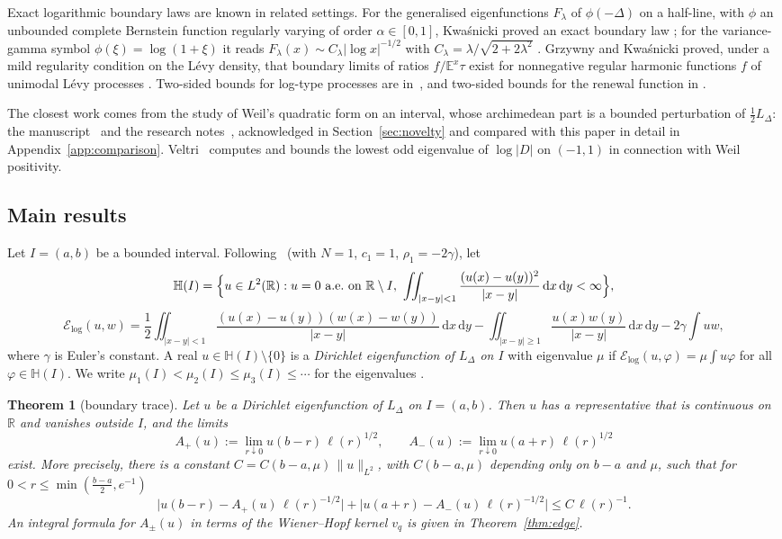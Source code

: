 \documentclass[11pt]{amsart}
\newcommand{\R}{\mathbb{R}}
\newcommand{\E}{\mathcal{E}}
\newcommand{\Hs}{\mathbb{H}}
\newcommand{\LD}{L_\Delta}
\newcommand{\dd}{\,\mathrm{d}}
\newtheorem{theorem}{Theorem}[section]
\theoremstyle{definition}
\theoremstyle{remark}
\numberwithin{equation}{section}
\begin{document}
Exact logarithmic boundary laws are known in related settings. For the generalised eigenfunctions $F_\lambda$ of $\phi(-\Delta)$ on a half-line, with $\phi$ an unbounded complete Bernstein function regularly varying of order $\alpha\in[0,1]$, Kwa\'snicki proved an exact boundary law \cite[Lemma~4.27]{Kw11}; for the variance-gamma symbol $\phi(\xi)=\log(1+\xi)$ it reads $F_\lambda(x)\sim C_\lambda|\log x|^{-1/2}$ with $C_\lambda=\lambda/\sqrt{2+2\lambda^2}$ \cite[Ex.~6.4]{Kw11}. Grzywny and Kwa\'snicki proved, under a mild regularity condition on the L\'evy density, that boundary limits of ratios $f/\mathbb E^x\tau$ exist for nonnegative regular harmonic functions $f$ of unimodal L\'evy processes \cite[Thm.~1.11]{GK18}. Two-sided bounds for log-type processes are in~\cite{GR12,KM14,BGR15}, and two-sided bounds for the renewal function in \cite[Thm.~4.4]{KMR13}.

The closest work comes from the study of Weil's quadratic form on an interval, whose archimedean part is a bounded perturbation of $\frac12\LD$: the manuscript~\cite{BT26} and the research notes~\cite{Mathia26}, acknowledged in Section~\ref{sec:novelty} and compared with this paper in detail in Appendix~\ref{app:comparison}. Veltri~\cite{Ve26} computes and bounds the lowest odd eigenvalue of $\log|D|$ on $(-1,1)$ in connection with Weil positivity.

\subsection{Main results}
Let $I=(a,b)$ be a bounded interval. Following~\cite{CW19} (with $N=1$, $c_1=1$, $\rho_1=-2\gamma$), let
\[
\Hs(I)=\Bigl\{u\in L^2(\R):u=0\text{ a.e.\ on }\R\setminus I,\ \iint_{|x-y|<1}\frac{(u(x)-u(y))^2}{|x-y|}\dd x\dd y<\infty\Bigr\},
\]
\[
\E_{\log}(u,w)=\frac12\iint_{|x-y|<1}\frac{(u(x)-u(y))(w(x)-w(y))}{|x-y|}\dd x\dd y-\iint_{|x-y|\ge1}\frac{u(x)w(y)}{|x-y|}\dd x\dd y-2\gamma\int uw,
\]
where $\gamma$ is Euler's constant. A real $u\in\Hs(I)\setminus\{0\}$ is a \emph{Dirichlet eigenfunction of $\LD$ on $I$} with eigenvalue $\mu$ if $\E_{\log}(u,\varphi)=\mu\int u\varphi$ for all $\varphi\in\Hs(I)$. We write $\mu_1(I)<\mu_2(I)\le\mu_3(I)\le\cdots$ for the eigenvalues \cite[Thm.~1.4]{CW19}.

\begin{theorem}[boundary trace]\label{thm:A}
Let $u$ be a Dirichlet eigenfunction of $\LD$ on $I=(a,b)$. Then $u$ has a representative that is continuous on $\R$ and vanishes outside $I$, and the limits
\[
A_+(u):=\lim_{r\downarrow0}u(b-r)\,\ell(r)^{1/2},\qquad A_-(u):=\lim_{r\downarrow0}u(a+r)\,\ell(r)^{1/2}
\]
exist. More precisely, there is a constant $C=C(b-a,\mu)\,\|u\|_{L^2}$, with $C(b-a,\mu)$ depending only on $b-a$ and $\mu$, such that for $0<r\le\min(\frac{b-a}2,e^{-1})$
\[
\bigl|u(b-r)-A_+(u)\,\ell(r)^{-1/2}\bigr|+\bigl|u(a+r)-A_-(u)\,\ell(r)^{-1/2}\bigr|\le C\,\ell(r)^{-1}.
\]
An integral formula for $A_\pm(u)$ in terms of the Wiener--Hopf kernel $v_q$ is given in Theorem~\ref{thm:edge}.
\end{theorem}
\end{document}
